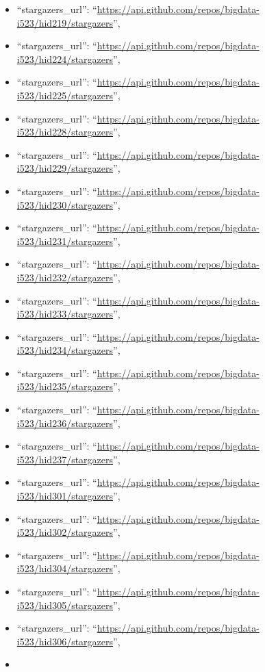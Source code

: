\begin{itemize}
\item
  ``stargazers\_url'':
  ``\url{https://api.github.com/repos/bigdata-i523/hid219/stargazers}'',
\item
  ``stargazers\_url'':
  ``\url{https://api.github.com/repos/bigdata-i523/hid224/stargazers}'',
\item
  ``stargazers\_url'':
  ``\url{https://api.github.com/repos/bigdata-i523/hid225/stargazers}'',
\item
  ``stargazers\_url'':
  ``\url{https://api.github.com/repos/bigdata-i523/hid228/stargazers}'',
\item
  ``stargazers\_url'':
  ``\url{https://api.github.com/repos/bigdata-i523/hid229/stargazers}'',
\item
  ``stargazers\_url'':
  ``\url{https://api.github.com/repos/bigdata-i523/hid230/stargazers}'',
\item
  ``stargazers\_url'':
  ``\url{https://api.github.com/repos/bigdata-i523/hid231/stargazers}'',
\item
  ``stargazers\_url'':
  ``\url{https://api.github.com/repos/bigdata-i523/hid232/stargazers}'',
\item
  ``stargazers\_url'':
  ``\url{https://api.github.com/repos/bigdata-i523/hid233/stargazers}'',
\item
  ``stargazers\_url'':
  ``\url{https://api.github.com/repos/bigdata-i523/hid234/stargazers}'',
\item
  ``stargazers\_url'':
  ``\url{https://api.github.com/repos/bigdata-i523/hid235/stargazers}'',
\item
  ``stargazers\_url'':
  ``\url{https://api.github.com/repos/bigdata-i523/hid236/stargazers}'',
\item
  ``stargazers\_url'':
  ``\url{https://api.github.com/repos/bigdata-i523/hid237/stargazers}'',
\item
  ``stargazers\_url'':
  ``\url{https://api.github.com/repos/bigdata-i523/hid301/stargazers}'',
\item
  ``stargazers\_url'':
  ``\url{https://api.github.com/repos/bigdata-i523/hid302/stargazers}'',
\item
  ``stargazers\_url'':
  ``\url{https://api.github.com/repos/bigdata-i523/hid304/stargazers}'',
\item
  ``stargazers\_url'':
  ``\url{https://api.github.com/repos/bigdata-i523/hid305/stargazers}'',
\item
  ``stargazers\_url'':
  ``\url{https://api.github.com/repos/bigdata-i523/hid306/stargazers}'',
\item

\end{itemize}
